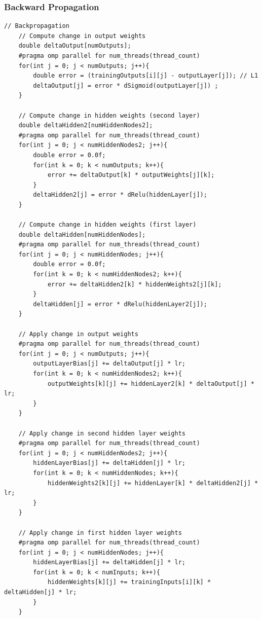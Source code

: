 \documentclass[11pt]{article}
\begin{document}
\subsubsection{Backward Propagation}
\begin{lstlisting}[style=CStyle, caption={Backward path openMP of main.c}, label={lst:backwardpathopenMP}]
    // Backpropagation
    // Compute change in output weights
    double deltaOutput[numOutputs];
    #pragma omp parallel for num_threads(thread_count)
    for(int j = 0; j < numOutputs; j++){
        double error = (trainingOutputs[i][j] - outputLayer[j]); // L1
        deltaOutput[j] = error * dSigmoid(outputLayer[j]) ;
    }

    // Compute change in hidden weights (second layer)
    double deltaHidden2[numHiddenNodes2];
    #pragma omp parallel for num_threads(thread_count)
    for(int j = 0; j < numHiddenNodes2; j++){
        double error = 0.0f;
        for(int k = 0; k < numOutputs; k++){
            error += deltaOutput[k] * outputWeights[j][k];
        }
        deltaHidden2[j] = error * dRelu(hiddenLayer[j]);
    }

    // Compute change in hidden weights (first layer)
    double deltaHidden[numHiddenNodes];
    #pragma omp parallel for num_threads(thread_count)
    for(int j = 0; j < numHiddenNodes; j++){
        double error = 0.0f;
        for(int k = 0; k < numHiddenNodes2; k++){
            error += deltaHidden2[k] * hiddenWeights2[j][k];
        }
        deltaHidden[j] = error * dRelu(hiddenLayer2[j]);
    }

    // Apply change in output weights
    #pragma omp parallel for num_threads(thread_count)
    for(int j = 0; j < numOutputs; j++){
        outputLayerBias[j] += deltaOutput[j] * lr;
        for(int k = 0; k < numHiddenNodes2; k++){
            outputWeights[k][j] += hiddenLayer2[k] * deltaOutput[j] * lr;
        }
    }

    // Apply change in second hidden layer weights
    #pragma omp parallel for num_threads(thread_count)
    for(int j = 0; j < numHiddenNodes2; j++){
        hiddenLayerBias[j] += deltaHidden[j] * lr;
        for(int k = 0; k < numHiddenNodes; k++){
            hiddenWeights2[k][j] += hiddenLayer[k] * deltaHidden2[j] * lr;
        }
    }

    // Apply change in first hidden layer weights
    #pragma omp parallel for num_threads(thread_count)
    for(int j = 0; j < numHiddenNodes; j++){
        hiddenLayerBias[j] += deltaHidden[j] * lr;
        for(int k = 0; k < numInputs; k++){
            hiddenWeights[k][j] += trainingInputs[i][k] * deltaHidden[j] * lr;
        }
    }
\end{lstlisting}
\end{document}
